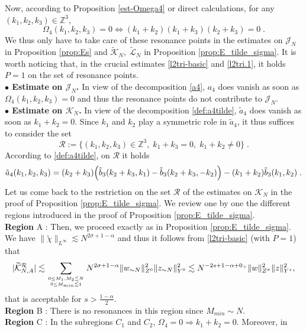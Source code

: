 \documentclass{amsart}
\theoremstyle{definition}
\theoremstyle{remark}
\newcommand{\Z}{\mathbb{Z}}
\numberwithin{equation}{section}
\begin{document}
 Now, according to Proposition \ref{est-Omega4} or direct calculations, for any $(k_1,k_2,k_3)\in \Z^3 $, 
$$
\Omega_4(k_1,k_2,k_3)=0 \Leftrightarrow (k_1+k_2)(k_1+k_3)(k_2+k_3)=0 \; .
$$
We thus only have to take care of these resonance points in the estimates on $ {\mathcal J}_N $ in Proposition \ref{prop:Es} and $\tilde{\mathcal K}_N,\; \tilde{\mathcal L}_N $ in Proposition \ref{prop:E_tilde_sigma}. It is worth noticing that, in the crucial estimates 
\eqref{l2tri-basic} and \eqref{l2tri.1}, it holds $P=1 $ on the set of resonance points.
 \vspace*{2mm} \\
{\bf $\bullet $ Estimate on $ {\mathcal J}_N $.} In view of the decomposition \eqref{a4}, $ a_4 $ does vanish as soon as $\Omega_4(k_1,k_2,k_3)=0$
 and thus the resonance points do not contribute to $ {\mathcal J}_N $.\\
 {\bf $\bullet $ Estimate on $ {\mathcal K}_N $.} In view of the decomposition \eqref{def:a4tilde}, $ \tilde{a}_4 $ does vanish as soon as $
 k_1+k_2=0 $. Since $k_1$ and $ k_2$ play a symmetric role in $ \tilde{a}_4 $, it thus suffices to consider  the set 
 $$
 {\mathcal R}:=\{(k_1,k_2,k_3)\in \Z^3, \;  k_1+k_3=0, \; k_1+k_2\neq 0 \}  \; .
 $$ According to  \eqref{def:a4tilde}, on ${\mathcal R}$ it holds 
 \begin{equation}\label{a4R}
\tilde{a}_4(k_1,k_2,k_3)=(k_2+k_3)\Bigl(\tilde{b}_3(k_2+k_3,k_1)-\tilde{b}_3(k_2+k_3,-k_2)\Bigr) -(k_1+k_2)\tilde{b}_3(k_1,k_2) \; . 
 \end{equation}
 Let us come back to  the restriction on the set ${\mathcal R} $ of the estimates on $ {\mathcal K}_N $ in the proof of Proposition \ref{prop:E_tilde_sigma}. We review one by one the different regions introduced in the proof of  Proposition \ref{prop:E_tilde_sigma}.\\
{\bf Region} A : Then, we proceed exactly as in    Proposition \ref{prop:E_tilde_sigma}.  We have $ \|\widetilde{\chi}\|_{L^\infty} \lesssim N^{2\sigma+1-\alpha}$ and thus it follows from \eqref{l2tri-basic}  (with $ P=1$) that
$$
|\widetilde{\mathcal{K}}_{N,A}^{\mathcal R}|\lesssim \sum_{0\le M_1,M_2\lesssim N \atop 0\le M_{min}\lesssim 1} N^{2\sigma+1-\alpha} \|w_{\sim N}\|_{Z^0}^2 \|z_{\sim N}\|_{Y^0}^2 \lesssim  N^{-2s+1-\alpha+0_+} \|w\|_{Z^\sigma}^2 \|z\|_{Y^s}^2,
$$
that is acceptable for $ s>\frac{1-\alpha}{2} $. \\
{\bf Region} B : There is no resonances in this region since $M_{min} \sim N $.\\
{\bf Region} C : In the subregions $ C_1 $ and $C_2 $, $\Omega_4=0 \Rightarrow k_1+k_2=0 $. Moreover, in 
\end{document}
